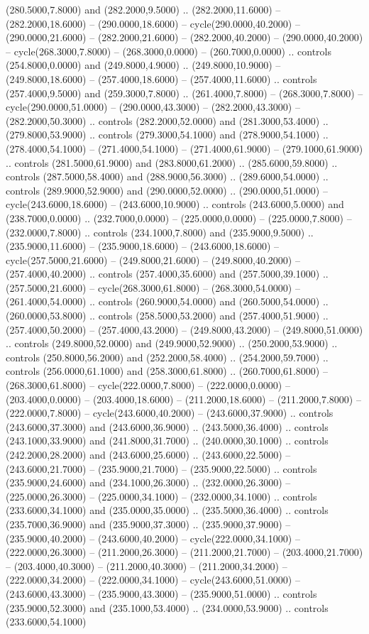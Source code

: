 (280.5000,7.8000) and (282.2000,9.5000) .. (282.2000,11.6000) -- (282.2000,18.6000) -- (290.0000,18.6000) -- cycle(290.0000,40.2000) -- (290.0000,21.6000) -- (282.2000,21.6000) -- (282.2000,40.2000) -- (290.0000,40.2000) -- cycle(268.3000,7.8000) -- (268.3000,0.0000) -- (260.7000,0.0000) .. controls (254.8000,0.0000) and (249.8000,4.9000) .. (249.8000,10.9000) -- (249.8000,18.6000) -- (257.4000,18.6000) -- (257.4000,11.6000) .. controls (257.4000,9.5000) and (259.3000,7.8000) .. (261.4000,7.8000) -- (268.3000,7.8000) -- cycle(290.0000,51.0000) -- (290.0000,43.3000) -- (282.2000,43.3000) -- (282.2000,50.3000) .. controls (282.2000,52.0000) and (281.3000,53.4000) .. (279.8000,53.9000) .. controls (279.3000,54.1000) and (278.9000,54.1000) .. (278.4000,54.1000) -- (271.4000,54.1000) -- (271.4000,61.9000) -- (279.1000,61.9000) .. controls (281.5000,61.9000) and (283.8000,61.2000) .. (285.6000,59.8000) .. controls (287.5000,58.4000) and (288.9000,56.3000) .. (289.6000,54.0000) .. controls (289.9000,52.9000) and (290.0000,52.0000) .. (290.0000,51.0000) -- cycle(243.6000,18.6000) -- (243.6000,10.9000) .. controls (243.6000,5.0000) and (238.7000,0.0000) .. (232.7000,0.0000) -- (225.0000,0.0000) -- (225.0000,7.8000) -- (232.0000,7.8000) .. controls (234.1000,7.8000) and (235.9000,9.5000) .. (235.9000,11.6000) -- (235.9000,18.6000) -- (243.6000,18.6000) -- cycle(257.5000,21.6000) -- (249.8000,21.6000) -- (249.8000,40.2000) -- (257.4000,40.2000) .. controls (257.4000,35.6000) and (257.5000,39.1000) .. (257.5000,21.6000) -- cycle(268.3000,61.8000) -- (268.3000,54.0000) -- (261.4000,54.0000) .. controls (260.9000,54.0000) and (260.5000,54.0000) .. (260.0000,53.8000) .. controls (258.5000,53.2000) and (257.4000,51.9000) .. (257.4000,50.2000) -- (257.4000,43.2000) -- (249.8000,43.2000) -- (249.8000,51.0000) .. controls (249.8000,52.0000) and (249.9000,52.9000) .. (250.2000,53.9000) .. controls (250.8000,56.2000) and (252.2000,58.4000) .. (254.2000,59.7000) .. controls (256.0000,61.1000) and (258.3000,61.8000) .. (260.7000,61.8000) -- (268.3000,61.8000) -- cycle(222.0000,7.8000) -- (222.0000,0.0000) -- (203.4000,0.0000) -- (203.4000,18.6000) -- (211.2000,18.6000) -- (211.2000,7.8000) -- (222.0000,7.8000) -- cycle(243.6000,40.2000) -- (243.6000,37.9000) .. controls (243.6000,37.3000) and (243.6000,36.9000) .. (243.5000,36.4000) .. controls (243.1000,33.9000) and (241.8000,31.7000) .. (240.0000,30.1000) .. controls (242.2000,28.2000) and (243.6000,25.6000) .. (243.6000,22.5000) -- (243.6000,21.7000) -- (235.9000,21.7000) -- (235.9000,22.5000) .. controls (235.9000,24.6000) and (234.1000,26.3000) .. (232.0000,26.3000) -- (225.0000,26.3000) -- (225.0000,34.1000) -- (232.0000,34.1000) .. controls (233.6000,34.1000) and (235.0000,35.0000) .. (235.5000,36.4000) .. controls (235.7000,36.9000) and (235.9000,37.3000) .. (235.9000,37.9000) -- (235.9000,40.2000) -- (243.6000,40.2000) -- cycle(222.0000,34.1000) -- (222.0000,26.3000) -- (211.2000,26.3000) -- (211.2000,21.7000) -- (203.4000,21.7000) -- (203.4000,40.3000) -- (211.2000,40.3000) -- (211.2000,34.2000) -- (222.0000,34.2000) -- (222.0000,34.1000) -- cycle(243.6000,51.0000) -- (243.6000,43.3000) -- (235.9000,43.3000) -- (235.9000,51.0000) .. controls (235.9000,52.3000) and (235.1000,53.4000) .. (234.0000,53.9000) .. controls (233.6000,54.1000) 